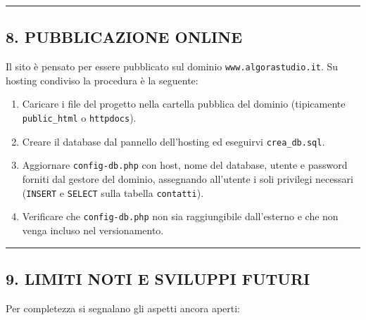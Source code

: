 \documentclass[
  11pt,
]{article}
\providecommand{\tightlist}{%
  \setlength{\itemsep}{0pt}\setlength{\parskip}{0pt}}
\begin{document}
\begin{center}\rule{0.5\linewidth}{0.5pt}\end{center}

\hypertarget{pubblicazione-online}{%
\subsection{8. PUBBLICAZIONE ONLINE}\label{pubblicazione-online}}

Il sito è pensato per essere pubblicato sul dominio
\texttt{www.algorastudio.it}. Su hosting condiviso la procedura è la
seguente:

\begin{enumerate}
\def\labelenumi{\arabic{enumi}.}
\tightlist
\item
  Caricare i file del progetto nella cartella pubblica del dominio
  (tipicamente \texttt{public\_html} o \texttt{httpdocs}).
\item
  Creare il database dal pannello dell'hosting ed eseguirvi
  \texttt{crea\_db.sql}.
\item
  Aggiornare \texttt{config-db.php} con host, nome del database, utente
  e password forniti dal gestore del dominio, assegnando all'utente i
  soli privilegi necessari (\texttt{INSERT} e \texttt{SELECT} sulla
  tabella \texttt{contatti}).
\item
  Verificare che \texttt{config-db.php} non sia raggiungibile
  dall'esterno e che non venga incluso nel versionamento.
\end{enumerate}

\begin{center}\rule{0.5\linewidth}{0.5pt}\end{center}

\hypertarget{limiti-noti-e-sviluppi-futuri}{%
\subsection{9. LIMITI NOTI E SVILUPPI
FUTURI}\label{limiti-noti-e-sviluppi-futuri}}

Per completezza si segnalano gli aspetti ancora aperti:
\end{document}
